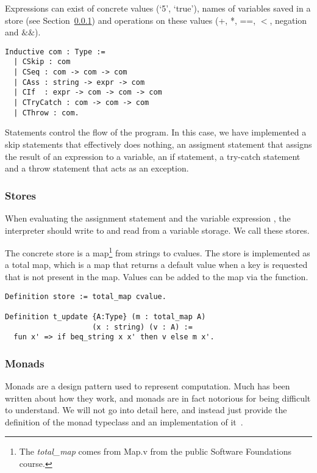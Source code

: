 Expressions can exist of concrete values (`5', `true'), names of variables
saved in a store (see Section~\ref{sec:stores}) and operations on these values
(+, *, ==, $<$, negation and $\&\&$). 

\begin{verbatim}
Inductive com : Type :=
  | CSkip : com
  | CSeq : com -> com -> com
  | CAss : string -> expr -> com
  | CIf  : expr -> com -> com -> com
  | CTryCatch : com -> com -> com
  | CThrow : com. 
\end{verbatim}

Statements control the flow of the program. In this case, we have implemented a
skip statements that effectively does nothing, an assigment statement that
assigns the result of an expression to a variable, an if statement, a try-catch
statement and a throw statement that acts as an exception.

\subsubsection{Stores}\label{sec:stores}
When evaluating the assignment statement  and the variable
expression , the interpreter should write to and read from a variable
storage. We call these stores. 

The concrete store is a map\footnote{The \textit{total\_map} comes from 
	Map.v from the public Software Foundations course.} 
from strings to cvalues. The store is implemented as a total map, which is a
map that returns a default value when a key is requested that is not present in
the map. Values can be added to the map via the  function.

\begin{verbatim}
Definition store := total_map cvalue.

Definition t_update {A:Type} (m : total_map A)
                    (x : string) (v : A) :=
  fun x' => if beq_string x x' then v else m x'.

\end{verbatim}

\subsubsection{Monads}\label{sec:monad}
Monads are a design pattern used to represent computation. Much has been
written about how they work, and monads are in fact notorious for being
difficult to understand. We will not go into detail here, and instead just 
provide the definition of the monad typeclass and an implementation of
it~\cite{kleisli1965every}.

